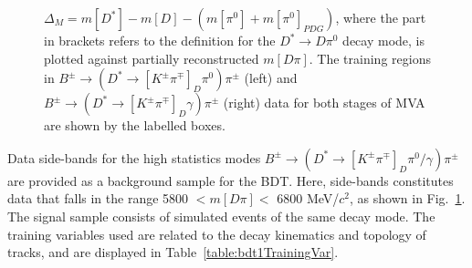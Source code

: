\documentclass[oneside,12pt]{article}
\begin{document}
\begin{figure}[H]
\centering
{}
\caption{\small{$\Delta_M=m[D^{*}] - m[D]- (m[\pi^0] + m[\pi^0]_{PDG})$, where
the part in brackets refers to the definition for the $D^*\rightarrow D\pi^0$
decay mode, is plotted against partially reconstructed $m[D\pi]$. The training
regions in $B^{\pm}\rightarrow (D^*\rightarrow
[K^{\pm}\pi^{\mp}]_D\pi^0)\pi^{\pm}$ (left) and $B^{\pm}\rightarrow
(D^*\rightarrow [K^{\pm}\pi^{\mp}]_D\gamma)\pi^{\pm}$ (right) data for both
stages of MVA are shown by the labelled boxes.}} \label{fig:trainingData}
\end{figure}

Data side-bands for the high statistics modes $B^{\pm}\rightarrow(D^{*}
\rightarrow [K^{\pm}\pi^{\mp}]_{D} \pi^0 /\gamma)\pi^{\pm}$ are provided as a
background sample for the BDT. Here, side-bands constitutes data that falls in
the range 5800 $ < m[D\pi] <$ 6800 MeV/$c^2$, as shown in
Fig.~\ref{fig:trainingData}. The signal sample consists of simulated events of
the same decay mode. The training variables used are related to the decay
kinematics and topology of tracks, and are displayed in
Table~\ref{table:bdt1TrainingVar}. 
\end{document}
